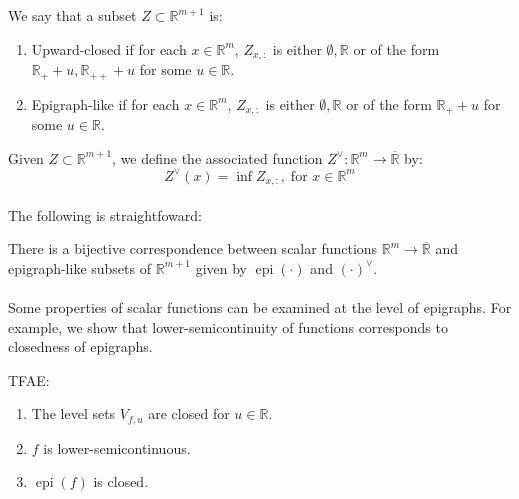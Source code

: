 \begin{defn}
	\label{defn:021-ucset-assfunc}
	We say that a subset $Z\subset \mathbb{R}^{m+1}$ is:
	\begin{enumerate}[label=(\alph*)]
		\item Upward-closed if for each $x\in \mathbb{R}^m$, $Z_{x,:}$ is either $\emptyset,\mathbb{R}$ or of the form $\mathbb{R}_++u,\mathbb{R}_{++}+u$ for some $u\in \mathbb{R}$.
		\item Epigraph-like if for each $x\in \mathbb{R}^m$, $Z_{x,:}$ is either $\emptyset,\mathbb{R}$ or of the form $\mathbb{R}_++u$ for some $u\in \mathbb{R}$.
	\end{enumerate}
	Given $Z\subset \mathbb{R}^{m+1}$, we define the associated function $Z^\vee:\mathbb{R}^m\to \overline{\mathbb{R}}$ by:
	\[
		Z^\vee(x)=\inf Z_{x,:},\;\text{for }x\in \mathbb{R}^m
	\]

\end{defn}

\paragraph{}The following is straightfoward:

\begin{prop}
	\label{prop:021-epi-corr-set}
	There is a bijective correspondence between scalar functions $\mathbb{R}^m\to \overline{\mathbb{R}}$ and epigraph-like subsets of $\mathbb{R}^{m+1}$ given by $\operatorname{epi}(\cdot)$ and $(\cdot)^\vee$.
\end{prop}

\paragraph{}Some properties of scalar functions can be examined at the level of epigraphs. For example, we show that lower-semicontinuity of functions corresponds to closedness of epigraphs.
\begin{prop}
	\label{prop:021-epi-lsc}
	TFAE:
	\begin{enumerate}[label=(\roman*)]
		\item The level sets $V_{f,u}$ are closed for $u\in \mathbb{R}$.
		\item $f$ is lower-semicontinuous.
		\item $\operatorname{epi}(f)$ is closed.
	\end{enumerate}
\end{prop}

